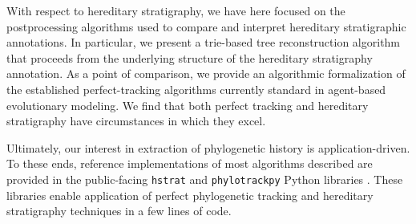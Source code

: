 With respect to hereditary stratigraphy, we have here focused on the postprocessing algorithms used to compare and interpret hereditary stratigraphic annotations.
In particular, we present a trie-based tree reconstruction algorithm that proceeds from the underlying structure of the hereditary stratigraphy annotation.
As a point of comparison, we provide an algorithmic formalization of the established perfect-tracking algorithms currently standard in agent-based evolutionary modeling.
We find that both perfect tracking and hereditary stratigraphy have circumstances in which they excel.


Ultimately, our interest in extraction of phylogenetic history is application-driven.
To these ends, reference implementations of most algorithms described are provided in the public-facing \texttt{hstrat} and \texttt{phylotrackpy} Python libraries \citep{moreno2022hstrat, dolson2023phylotrackpy}.
These libraries enable application of perfect phylogenetic tracking and hereditary stratigraphy techniques in a few lines of code.
